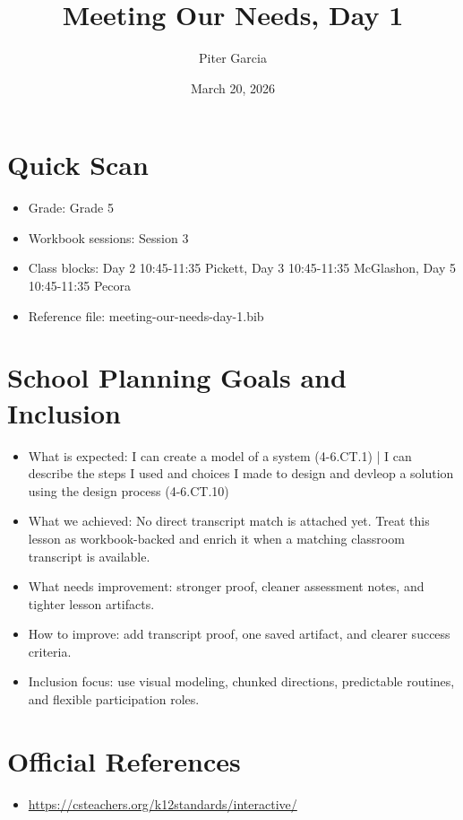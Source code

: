 \documentclass[11pt]{article}
\title{Meeting Our Needs, Day 1}
\author{Piter Garcia}
\date{March 20, 2026}
\begin{document}
\maketitle
\section*{Quick Scan}
\begin{itemize}[leftmargin=*]
\item Grade: Grade 5
\item Workbook sessions: Session 3
\item Class blocks: Day 2 10:45-11:35 Pickett, Day 3 10:45-11:35 McGlashon, Day 5 10:45-11:35 Pecora
\item Reference file: meeting-our-needs-day-1.bib
\end{itemize}
\section*{School Planning Goals and Inclusion}
\begin{itemize}[leftmargin=*]
\item What is expected: I can create a model of a system (4-6.CT.1) | I can describe the steps I used and choices I made to design and devleop a solution using the design process (4-6.CT.10)
\item What we achieved: No direct transcript match is attached yet. Treat this lesson as workbook-backed and enrich it when a matching classroom transcript is available.
\item What needs improvement: stronger proof, cleaner assessment notes, and tighter lesson artifacts.
\item How to improve: add transcript proof, one saved artifact, and clearer success criteria.
\item Inclusion focus: use visual modeling, chunked directions, predictable routines, and flexible participation roles.
\end{itemize}
\section*{Official References}
\begin{itemize}[leftmargin=*]
\item \url{https://csteachers.org/k12standards/interactive/}

\end{itemize}
\end{document}
